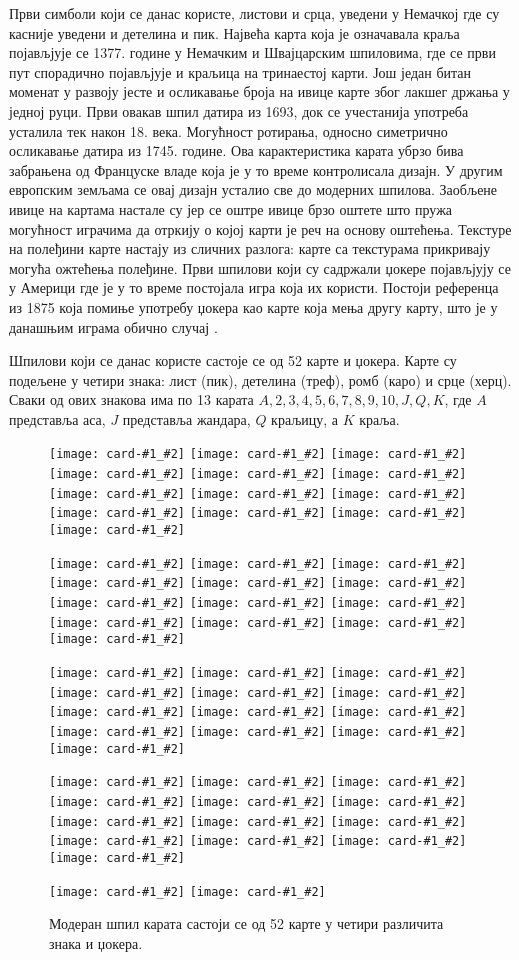 \documentclass[a4paper, 12pt, ngerman]{article}
\newcommand{\cardsm}[2]{\texttt{[image: card-\#1\_\#2]}}
\begin{document}
Први симболи који се данас користе, листови и срца, уведени у Немачкој где су касније уведени и детелина и пик. Највећа карта која је означавала краља појављјује се 1377. године у Немачким и Швајцарским шпиловима, где се први пут спорадично појављјује и краљица на тринаестој карти. Још један битан моменат у развоју јесте и осликавање броја на ивице карте због лакшег држања у једној руци. Први овакав шпил датира из 1693, док се учестанија употреба усталила тек након 18. века. Могућност ротирања, односно симетрично осликавање датира из 1745. године. Ова карактеристика карата убрзо бива забрањена од Француске владе која је у то време контролисала дизајн. У другим европским земљама се овај дизајн усталио све до модерних шпилова. Заобљене ивице на картама настале су јер се оштре ивице брзо оштете што пружа могућност играчима да отркију о којој карти је реч на основу оштећења. Текстуре на полеђини карте настају из сличних разлога: карте са текстурама прикривају могућа ожтећења полеђине. Први шпилови који су садржали џокере појављјују се у Америци где је у то време постојала игра која их користи. Постоји референца из 1875 која помиње употребу џокера као карте која мења другу карту, што је у данашњим играма обично случај \cite{wopc}.

Шпилови који се данас користе састоје се од 52 карте и џокера. Карте су подељене у четири знака: лист (пик), детелина (треф), ромб (каро) и срце (херц). Сваки од ових знакова има по 13 карата $A, 2, 3, 4, 5, 6, 7, 8, 9, 10, J, Q, K$, где $A$ представља аса, $J$ представља жандара, $Q$ краљицу, а $K$ краља.

\begin{figure}[htbp]
	\centering
	\cardsm{1}{spade}
	\cardsm{2}{spade}
	\cardsm{3}{spade}
	\cardsm{4}{spade}
	\cardsm{5}{spade}
	\cardsm{6}{spade}
	\cardsm{7}{spade}
	\cardsm{8}{spade}
	\cardsm{9}{spade}
	\cardsm{10}{spade}
	\cardsm{jack}{spade}
	\cardsm{queen}{spade}
	\cardsm{king}{spade}
	
	\cardsm{1}{heart}
	\cardsm{2}{heart}
	\cardsm{3}{heart}
	\cardsm{4}{heart}
	\cardsm{5}{heart}
	\cardsm{6}{heart}
	\cardsm{7}{heart}
	\cardsm{8}{heart}
	\cardsm{9}{heart}
	\cardsm{10}{heart}
	\cardsm{jack}{heart}
	\cardsm{queen}{heart}
	\cardsm{king}{heart}
	
	\cardsm{1}{club}
	\cardsm{2}{club}
	\cardsm{3}{club}
	\cardsm{4}{club}
	\cardsm{5}{club}
	\cardsm{6}{club}
	\cardsm{7}{club}
	\cardsm{8}{club}
	\cardsm{9}{club}
	\cardsm{10}{club}
	\cardsm{jack}{club}
	\cardsm{queen}{club}
	\cardsm{king}{club}
	
	\cardsm{1}{diamond}
	\cardsm{2}{diamond}
	\cardsm{3}{diamond}
	\cardsm{4}{diamond}
	\cardsm{5}{diamond}
	\cardsm{6}{diamond}
	\cardsm{7}{diamond}
	\cardsm{8}{diamond}
	\cardsm{9}{diamond}
	\cardsm{10}{diamond}
	\cardsm{jack}{diamond}
	\cardsm{queen}{diamond}
	\cardsm{king}{diamond}
	
	\cardsm{black}{joker}
	\cardsm{red}{joker}
	\caption{Модеран шпил карата састоји се од 52 карте у четири различита знака и џокера.}
\end{figure}
\end{document}
